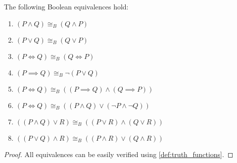 \begin{proposition}\label{thm:boolean_equivalences}
  The following Boolean equivalences hold:
  \begin{enumerate}
    \item \( (P \land Q) \cong_B (Q \land P) \)
    \item \( (P \lor Q) \cong_B (Q \lor P) \)
    \item \( (P \iff Q) \cong_B (Q \iff P) \)
    \item \( (P \implies Q) \cong_B \neg (P \lor Q) \)
    \item \( (P \iff Q) \cong_B ((P \implies Q) \land (Q \implies P)) \)
    \item \( (P \iff Q) \cong_B ((P \land Q) \lor (\neg P \land \neg Q)) \)
    \item \( ((P \land Q) \lor R) \cong_B ((P \lor R) \land (Q \lor R)) \)
    \item \( ((P \lor Q) \land R) \cong_B ((P \land R) \lor (Q \land R)) \)
  \end{enumerate}
\end{proposition}
\begin{proof}
  All equivalences can be easily verified using \cref{def:truth_functions}.
\end{proof}
